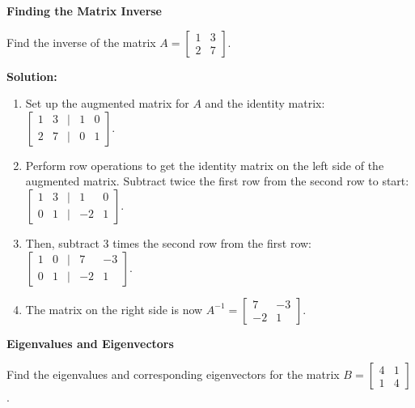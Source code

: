\documentclass[8pt, a4paper, landscape]{extarticle}
\begin{document}
\begin{multicols*}{5}
  \textbf{Finding the Matrix Inverse}

  Find the inverse of the matrix $A = \begin{bmatrix} 1 & 3 \\ 2 & 7 \end{bmatrix}$.

  \textbf{Solution:}
  \begin{enumerate}
    \item Set up the augmented matrix for $A$ and the identity matrix: $\begin{bmatrix} 1 & 3 & | & 1 & 0 \\ 2 & 7 & | & 0 & 1 \end{bmatrix}$.
    \item Perform row operations to get the identity matrix on the left side of the augmented matrix. Subtract twice the first row from the second row to start: $\begin{bmatrix} 1 & 3 & | & 1 & 0 \\ 0 & 1 & | & -2 & 1 \end{bmatrix}$.
    \item Then, subtract 3 times the second row from the first row: $\begin{bmatrix} 1 & 0 & | & 7 & -3 \\ 0 & 1 & | & -2 & 1 \end{bmatrix}$.
    \item The matrix on the right side is now $A^{-1} = \begin{bmatrix} 7 & -3 \\ -2 & 1 \end{bmatrix}$.
  \end{enumerate}

  \textbf{Eigenvalues and Eigenvectors}

  Find the eigenvalues and corresponding eigenvectors for the matrix $B = \begin{bmatrix} 4 & 1 \\ 1 & 4 \end{bmatrix}$.


\end{multicols*}
\end{document}
